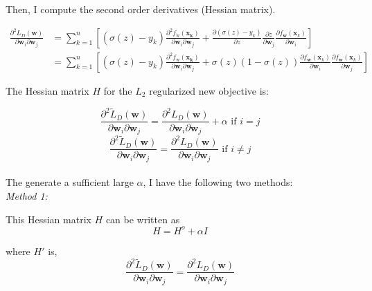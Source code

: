 \documentclass{article}
\begin{document}
Then, I compute the second order derivatives (Hessian matrix).

\begin{equation}
    \begin{split}
        \frac{\partial^{2}  L_{D}(\mathbf{w})}{\partial \mathbf{w}_{i} \partial \mathbf{w}_{j}} &=\sum_{k=1}^n \left[ (\sigma(z) - y_k )  \frac{\partial^{2} f_{\mathrm{w}}(\mathbf{x_k})}{\partial \mathbf{w}_{i} \partial \mathbf{w}_{j}} + \frac{\partial (\sigma(z) - y_k)}{\partial z} \frac{\partial z}{\partial \mathbf{w}_j} \frac{\partial f_{\mathbf{w}}\left(\mathbf{x}_{k}\right) }{\partial \mathbf{w}_i}  \right]\\
        &= \sum_{k=1}^n \left[ (\sigma(z) - y_k )  \frac{\partial^{2} f_{\mathrm{w}}(\mathbf{x_k})}{\partial \mathbf{w}_{i} \partial \mathbf{w}_{j}} + \sigma(z)(1-\sigma(z)) \frac{\partial f_{\mathbf{w}}\left(\mathbf{x}_{k}\right) }{\partial \mathbf{w}_i} \frac{\partial f_{\mathbf{w}}\left(\mathbf{x}_{k}\right) }{\partial \mathbf{w}_j} \right]
    \end{split}
\end{equation}

The Hessian matrix $H$ for the $L_2$ regularized new objective is:

\begin{equation}
\frac{\partial^{2}  \widetilde{L}_{D}(\mathbf{w})}{\partial \mathbf{w}_{i} \partial \mathbf{w}_{j}} = \frac{\partial^{2}  L_{D}(\mathbf{w})}{\partial \mathbf{w}_{i} \partial \mathbf{w}_{j}}+\alpha \text{     if $i = j$}
\end{equation}
\begin{equation}
\frac{\partial^{2}  \widetilde{L}_{D}(\mathbf{w})}{\partial \mathbf{w}_{i} \partial \mathbf{w}_{j}} = \frac{\partial^{2}  L_{D}(\mathbf{w})}{\partial \mathbf{w}_{i} \partial \mathbf{w}_{j}} \text{     if $i \neq j$}
\end{equation}
\\
The generate a sufficient large $\alpha$, I have the following two methods:\\

\textit{Method 1: }

This Hessian matrix $H$ can be written as
\begin{equation}
    H = H^o + \alpha I
\end{equation}

where $H'$ is,
\begin{equation}
    \frac{\partial^{2}  \widetilde{L}_{D}(\mathbf{w})}{\partial \mathbf{w}_{i} \partial \mathbf{w}_{j}} = \frac{\partial^{2}  L_{D}(\mathbf{w})}{\partial \mathbf{w}_{i} \partial \mathbf{w}_{j}}
\end{equation}
\end{document}
